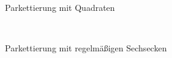 \documentclass{article}
\begin{document}
\begin{figure}[!ht]
  \centering
  \qquad
  \\
  \caption{Parkettierung mit Quadraten}
  \label{fig:tess_square}
\end{figure}

\begin{figure}[!ht]
  \centering
  \qquad
  \\
  \caption{Parkettierung mit regelmäßigen Sechsecken}
  \label{fig:tess_hexagon}
\end{figure}
\end{document}
